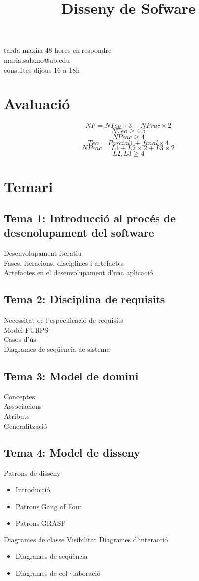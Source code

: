 \documentclass{article}
\title{Disseny de Sofware}
\begin{document}
\maketitle
\newpage
tarda maxim 48 hores en respondre\\
maria.salamo@ub.edu\\
consultes dijous 16 a 18h\\

\section{Avaluació}
$$NF = NTeo \times 3 + NPrac \times 2$$
$$NTeo \ge 4.5$$
$$NPrac \ge 4$$
$$Teo = Parcial1 + final \times 4$$
$$NPrac = L1 + L2 \times 2 + L3 \times 2$$
$$L2, L3 \ge 4$$

\section{Temari}

\subsection{Tema 1: Introducció al procés de desenolupament del software}
Desenvolupament iteratiu\\
Fases, iteracions, disciplines i artefactes\\
Artefactes en el desenvolupament d'una aplicació

\subsection{Tema 2: Disciplina de requisits}
Necessitat de l'especificació de requisits\\
Model FURPS+\\
Casos d'ús\\
Diagrames de seqüència de sistema

\subsection{Tema 3: Model de domini}
Conceptes\\
Associacions\\
Atributs\\
Generalització

\subsection{Tema 4: Model de disseny}
Patrons de disseny\\
\begin{itemize}
	\item Introducció
	\item Patrons Gang of Four
	\item Patrons GRASP
\end{itemize}
Diagrames de classe
Visibilitat
Diagrames d'interacció
\begin{itemize}
	\item Diagrames de seqüència
	\item Diagrames de col·laboració
\end{itemize}
\end{document}
